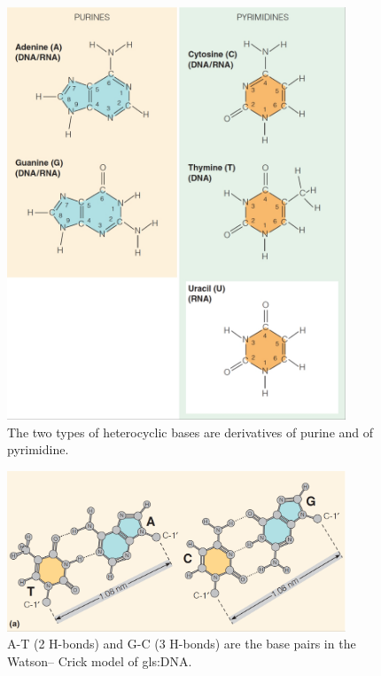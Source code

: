\documentclass[]{article}
\begin{document}
\begin{figure}[H]
	\caption[The heterocyclic bases are
	derivatives of purine and of pyrimidine]{The two types of heterocyclic bases are
		derivatives of purine and of pyrimidine.}\label{fig:Nucleobases} 
	\includegraphics[width=0.9\textwidth]{Nucleobases}
\end{figure}

\begin{figure}[H]
	\caption[A-T  and G-C are the base pairs in the Watson–
		Crick model]{A-T (2 H-bonds) and G-C (3 H-bonds) are the base pairs in the Watson–
		Crick model of \gls{gls:DNA}.}\label{fig:BasePairs} 
	\includegraphics[width=0.9\textwidth]{BasePairs}
\end{figure}
\end{document}
